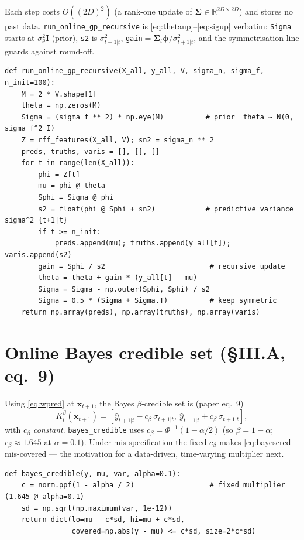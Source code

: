 \documentclass[11pt]{article}
\theoremstyle{plain}
\theoremstyle{definition}
\newcommand{\R}{\mathbb{R}}
\newcommand{\I}{\mathbf{I}}
\newcommand{\x}{\mathbf{x}}
\newcommand{\bphi}{\boldsymbol{\phi}}
\newcommand{\bSigma}{\boldsymbol{\Sigma}}
\newcommand{\hy}{\hat{y}}
\newcommand{\code}[1]{\texttt{#1}}
\begin{document}
Each step costs $O((2D)^2)$ (a rank-one update of $\bSigma\in\R^{2D\times2D}$) and stores no past data. \code{run\_online\_gp\_recursive} is \eqref{eq:thetaup}--\eqref{eq:sigup} verbatim: \code{Sigma} starts at $\sigma_\theta^2\I$ (prior), \code{s2} is $\sigma^2_{t+1|t}$, \code{gain}$=\bSigma_t\bphi/\sigma^2_{t+1|t}$, and the symmetrisation line guards against round-off.
\begin{lstlisting}
def run_online_gp_recursive(X_all, y_all, V, sigma_n, sigma_f, n_init=100):
    M = 2 * V.shape[1]
    theta = np.zeros(M)
    Sigma = (sigma_f ** 2) * np.eye(M)          # prior  theta ~ N(0, sigma_f^2 I)
    Z = rff_features(X_all, V); sn2 = sigma_n ** 2
    preds, truths, varis = [], [], []
    for t in range(len(X_all)):
        phi = Z[t]
        mu = phi @ theta
        Sphi = Sigma @ phi
        s2 = float(phi @ Sphi + sn2)            # predictive variance sigma^2_{t+1|t}
        if t >= n_init:
            preds.append(mu); truths.append(y_all[t]); varis.append(s2)
        gain = Sphi / s2                         # recursive update
        theta = theta + gain * (y_all[t] - mu)
        Sigma = Sigma - np.outer(Sphi, Sphi) / s2
        Sigma = 0.5 * (Sigma + Sigma.T)          # keep symmetric
    return np.array(preds), np.array(truths), np.array(varis)
\end{lstlisting}

\section{Online Bayes credible set (\S III.A, eq.~9)}\label{sec:bayescred}
Using \eqref{eq:wpred} at $\x_{t+1}$, the Bayes $\beta$-credible set is (paper eq.~9)
\begin{equation}
K_t^\beta(\x_{t+1})=[\hy_{t+1|t}-c_\beta\,\sigma_{t+1|t},\ \hy_{t+1|t}+c_\beta\,\sigma_{t+1|t}],
\label{eq:bayescred}
\end{equation}
with $c_\beta$ \emph{constant}. \code{bayes\_credible} uses $c_\beta=\Phi^{-1}(1-\alpha/2)$ (so $\beta=1-\alpha$; $c_\beta\approx1.645$ at $\alpha=0.1$). Under mis-specification the fixed $c_\beta$ makes \eqref{eq:bayescred} mis-covered --- the motivation for a data-driven, time-varying multiplier next.
\begin{lstlisting}
def bayes_credible(y, mu, var, alpha=0.1):
    c = norm.ppf(1 - alpha / 2)                  # fixed multiplier (1.645 @ alpha=0.1)
    sd = np.sqrt(np.maximum(var, 1e-12))
    return dict(lo=mu - c*sd, hi=mu + c*sd,
                covered=np.abs(y - mu) <= c*sd, size=2*c*sd)
\end{lstlisting}
\end{document}
